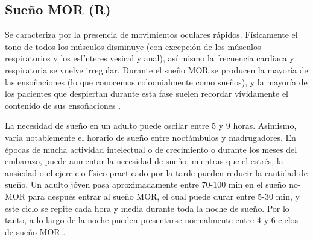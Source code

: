 
\subsection{Sueño MOR (R)}

Se caracteriza por la presencia de movimientos oculares r\'apidos. F\'isicamente el tono de todos 
los m\'usculos disminuye (con excepción de los m\'usculos respiratorios y los esf\'interes vesical 
y anal), as\'i mismo la frecuencia cardiaca y respiratoria se vuelve irregular.%
Durante el sue\~no MOR se producen la mayor\'ia de las enso\~naciones (lo que conocemos 
coloquialmente como sue\~nos), y la mayor\'ia de los pacientes que despiertan durante esta fase 
suelen recordar v\'ividamente el contenido de sus enso\~naciones \cite{Chokroverty09}.


La necesidad de sue\~no en un adulto puede oscilar entre 5 y 9 horas. Asimismo, var\'ia 
notablemente el horario de sueño entre noct\'ambulos y madrugadores. En \'epocas de mucha actividad 
intelectual o de crecimiento o durante los meses del embarazo, puede aumentar la necesidad de 
sue\~no, mientras que el estr\'es, la ansiedad o el ejercicio f\'isico practicado por la tarde 
pueden reducir la cantidad de sue\~no. 
Un adulto j\'oven pasa aproximadamente entre 70-100 min en el sue\~no no-MOR para despu\'es entrar 
al sue\~no MOR, el cual puede durar entre 5-30 min, y este ciclo se repite cada hora y media 
durante toda la noche de sue\~no. 
Por lo tanto, a lo largo de la noche pueden presentarse normalmente entre 4 y 6 ciclos de 
sue\~no MOR \cite{CarrilloMora}.

